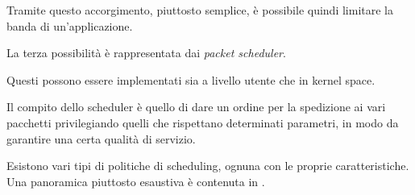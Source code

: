 Tramite questo accorgimento, piuttosto semplice, è possibile quindi limitare la banda di un'applicazione.

La terza possibilità è rappresentata dai \emph{packet scheduler}.

Questi possono essere implementati sia a livello utente che in kernel space.

Il compito dello scheduler è quello di dare un ordine per la spedizione ai vari pacchetti privilegiando quelli che rispettano determinati parametri, in modo da garantire una certa qualità di servizio.

Esistono vari tipi di politiche di scheduling, ognuna con le proprie caratteristiche. Una panoramica piuttosto esaustiva è contenuta in \cite{ps}.